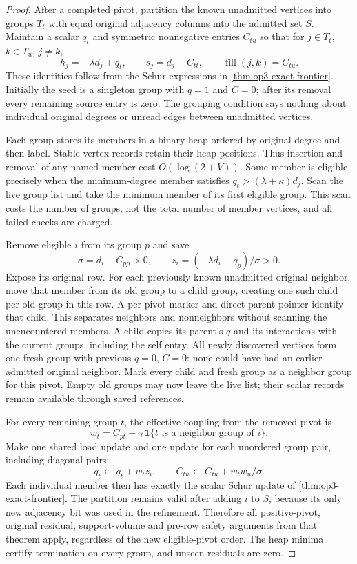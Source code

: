 \begin{proof}
After a completed pivot, partition the known unadmitted vertices into
groups $T_t$ with equal original adjacency columns into the admitted set
$S$. Maintain a scalar $q_t$ and symmetric nonnegative entries $C_{tu}$ so
that for $j\in T_t$, $k\in T_u$, $j\ne k$,
\[
 h_j=-\lambda d_j+q_t,\qquad s_j=d_j-C_{tt},\qquad
 \operatorname{fill}(j,k)=C_{tu}.
\]
These identities follow from the Schur expressions in
\cref{thm:op3-exact-frontier}. Initially the seed is a singleton group with
$q=1$ and $C=0$; after its removal every remaining source entry is zero.
The grouping condition says nothing about individual original degrees or
unread edges between unadmitted vertices.

Each group stores its members in a binary heap ordered by original degree
and then label. Stable vertex records retain their heap positions. Thus
insertion and removal of any named member cost $O(\log(2+V))$. Some member
is eligible precisely when the minimum-degree member satisfies
$q_t>(\lambda+\kappa)d_j$. Scan the live group list and take the minimum
member of its first eligible group. This scan costs the number of groups,
not the total number of member vertices, and all failed checks are charged.

Remove eligible $i$ from its group $p$ and save
\[
 \sigma=d_i-C_{pp}>0,\qquad
 z_i=(-\lambda d_i+q_p)/\sigma>0.
\]
Expose its original row. For each previously known unadmitted original
neighbor, move that member from its old group to a child group, creating
one such child per old group in this row. A per-pivot marker and direct
parent pointer identify that child. This separates neighbors and
nonneighbors without scanning the unencountered members. A child copies
its parent's $q$ and its interactions with the current groups, including
the self entry. All newly discovered vertices form one fresh group with
previous $q=0$, $C=0$: none could have had an earlier admitted original
neighbor. Mark every child and fresh group as a neighbor group for this
pivot. Empty old groups may now leave the live list; their scalar records
remain available through saved references.

For every remaining group $t$, the effective coupling from the removed
pivot is
\[
 w_t=C_{pt}+\gamma\,\mathbf1\{t\text{ is a neighbor group of }i\}.
\]
Make one shared load update and one update for each unordered group pair,
including diagonal pairs:
\[
 q_t\gets q_t+w_tz_i,
 \qquad C_{tu}\gets C_{tu}+w_tw_u/\sigma.
\]
Each individual member then has exactly the scalar Schur update of
\cref{thm:op3-exact-frontier}. The partition remains valid after adding
$i$ to $S$, because its only new adjacency bit was used in the refinement.
Therefore all positive-pivot, original residual, support-volume and
pre-row safety arguments from that theorem apply, regardless of the new
eligible-pivot order. The heap minima certify termination on every group,
and unseen residuals are zero.


\end{proof}
